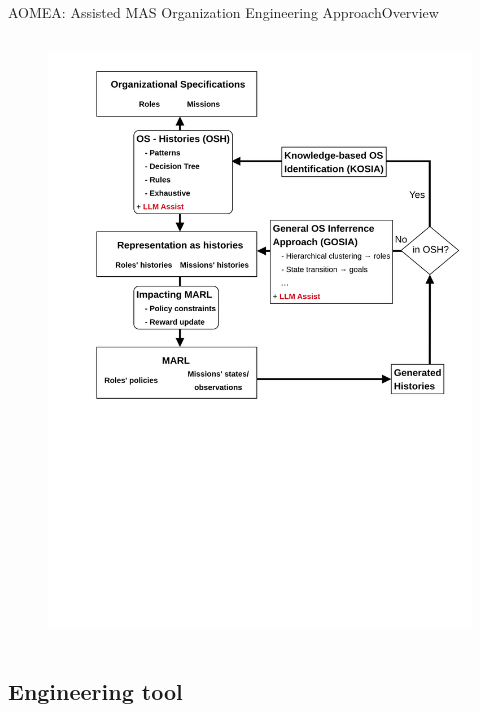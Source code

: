 \begin{frame}{AOMEA: Assisted MAS Organization Engineering Approach}{Overview}
\begin{columns}
\begin{column}{0.5\textwidth}
            \centering
            \begin{figure}
                \vspace{-4ex}
                \includegraphics[width=1.1\linewidth]{figures/prahom_overview.png}
            \end{figure}

        \end{column}

    \end{columns}

\end{frame}


\subsection{Engineering tool}

